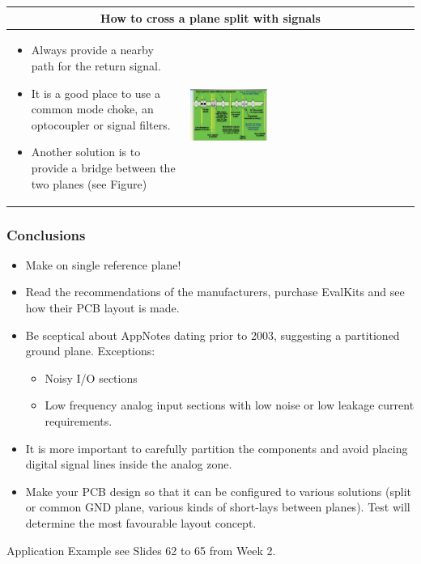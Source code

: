				\clearpage
				\begin{table}[h!]
				\centering
				\begin{tabular}{|m{}|m{}|}
						\multicolumn{2}{c}{\textbf{How to cross a plane split with signals}}
					\\
					\hline
						\begin{itemize}
							\item Always provide a nearby path for the return signal. 
							\item It is a good place to use a common mode choke, an optocoupler or signal filters. 
							\item Another solution is to provide a bridge between the two planes (see Figure)
						\end{itemize}
					& 
						\begin{center}\includegraphics[width=0.35\textwidth]{images/CrossSplitPlane.png}\end{center}  
					\\	
					\hline
					\end{tabular}
				\end{table}	


			\subsubsection{Conclusions}
			\begin{itemize}
				\item Make on single reference plane!
				\item Read the recommendations of the manufacturers, purchase EvalKits and see how their PCB layout is made. 
				\item Be sceptical about AppNotes dating prior to 2003, suggesting a partitioned ground plane. Exceptions: 
				\begin{itemize}
					\item Noisy I/O sections
					\item Low frequency analog input sections with low noise or low leakage current requirements. 
				\end{itemize}
				\item It is more important to carefully partition the components and avoid placing digital signal lines inside the analog zone. 
				\item Make your PCB design so that it can be configured to various solutions (split or common GND plane, various kinds of short-lays between planes). Test will determine the most favourable layout concept. 
			\end{itemize}
			Application Example see Slides 62 to 65 from Week 2. 
			
